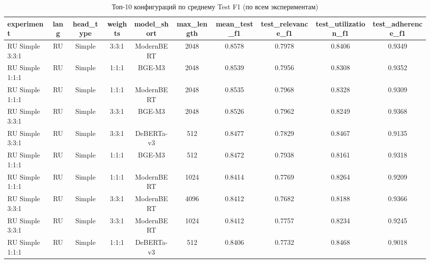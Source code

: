 \begin{table}
\caption{Топ-10 конфигураций по среднему Test F1 (по всем экспериментам)}
\label{tab:leaderboard_top10}
\begin{tabular}{lccccccccc}
\toprule
experiment & lang & head\_type & weights & model\_short & max\_length & mean\_test\_f1 & test\_relevance\_f1 & test\_utilization\_f1 & test\_adherence\_f1 \\
\midrule
RU Simple 3:3:1 & RU & Simple & 3:3:1 & ModernBERT & 2048 & 0.8578 & 0.7978 & 0.8406 & 0.9349 \\
RU Simple 1:1:1 & RU & Simple & 1:1:1 & BGE-M3 & 2048 & 0.8539 & 0.7956 & 0.8308 & 0.9352 \\
RU Simple 1:1:1 & RU & Simple & 1:1:1 & ModernBERT & 2048 & 0.8535 & 0.7968 & 0.8328 & 0.9309 \\
RU Simple 3:3:1 & RU & Simple & 3:3:1 & BGE-M3 & 2048 & 0.8526 & 0.7962 & 0.8249 & 0.9368 \\
RU Simple 3:3:1 & RU & Simple & 3:3:1 & DeBERTa-v3 & 512 & 0.8477 & 0.7829 & 0.8467 & 0.9135 \\
RU Simple 1:1:1 & RU & Simple & 1:1:1 & BGE-M3 & 512 & 0.8472 & 0.7938 & 0.8161 & 0.9318 \\
RU Simple 1:1:1 & RU & Simple & 1:1:1 & ModernBERT & 1024 & 0.8414 & 0.7769 & 0.8264 & 0.9209 \\
RU Simple 3:3:1 & RU & Simple & 3:3:1 & ModernBERT & 4096 & 0.8412 & 0.7682 & 0.8188 & 0.9366 \\
RU Simple 3:3:1 & RU & Simple & 3:3:1 & ModernBERT & 1024 & 0.8412 & 0.7757 & 0.8234 & 0.9245 \\
RU Simple 1:1:1 & RU & Simple & 1:1:1 & DeBERTa-v3 & 512 & 0.8406 & 0.7732 & 0.8468 & 0.9018 \\
\bottomrule
\end{tabular}
\end{table}
